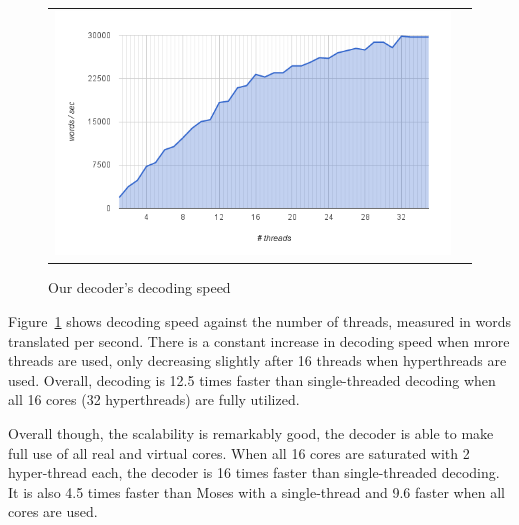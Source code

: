 \documentclass[11pt]{article}
\begin{document}
\begin{figure}[h]
\centering
\begin{tabular}{cc}
{\includegraphics[scale=0.4]{scalability.png}} 
\end{tabular}
\caption{Our decoder's decoding speed}
\label{fig:speed}
\end{figure} 

Figure~\ref{fig:speed} shows decoding speed against the number of threads, measured in words translated per second. There is a constant increase in decoding speed when mrore threads are used, only decreasing slightly after 16 threads when hyperthreads are used. Overall, decoding is 12.5 times faster than single-threaded decoding when all 16 cores (32 hyperthreads) are fully utilized.


Overall though, the scalability is remarkably good, the decoder is able to make full use of all real and virtual cores. When all 16 cores are saturated with 2 hyper-thread each, the decoder is 16 times faster than single-threaded decoding. It is also 4.5 times faster than Moses with a single-thread and 9.6 faster when all cores are used.
\end{document}
